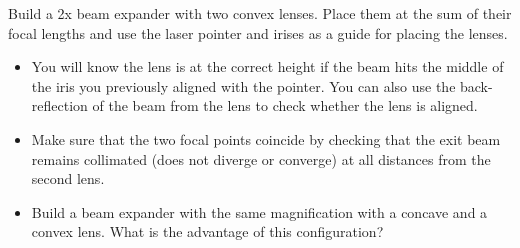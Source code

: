 \documentclass[a4paper]{report}
\newcommand{\nexercise}[0]{\arabic{exercises}\addtocounter{exercises}{1}}
\begin{document}
\begin{exercisebox}[frametitle={Exercise \nexercise: Beam expander}]
Build a 2x beam expander with two convex lenses. Place them at the sum of their focal lengths and use the laser pointer and irises as a guide for placing the lenses. 
\begin{itemize}
\item You will know the lens is at the correct height if the beam hits the middle of the iris you previously aligned with the pointer. 
You can also use the back-reflection of the beam from the lens to check whether the lens is aligned. 
\item Make sure that the two focal points coincide by checking that the exit beam remains collimated (does not diverge or converge) at all distances from the second lens. 
\item Build a beam expander with the same magnification with a concave and a convex lens. What is the advantage of this configuration?
\end{itemize}
\end{exercisebox}
\end{document}

